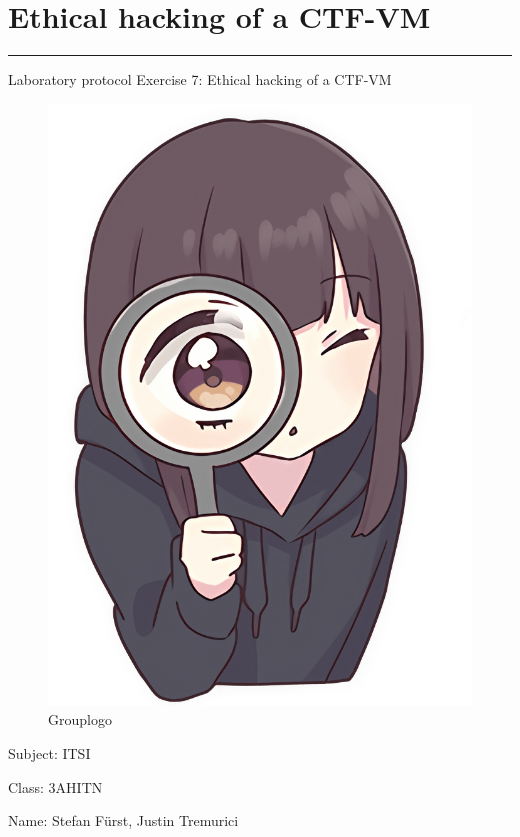\documentclass[a4paper]{article}
\begin{document}

\pagestyle{oida}
\section*{Ethical hacking of a CTF-VM}
\par\noindent\rule{\textwidth}{0.4pt}

Laboratory protocol
Exercise 7: Ethical hacking of a CTF-VM

\begin{figure}[h]
	\includegraphics[scale=0.5]{images/menheraMagnifier.png}
	\centering
	\caption{Grouplogo}
\end{figure}

\vspace*{\fill}
Subject:	ITSI

Class:	3AHITN

Name:	Stefan Fürst, Justin Tremurici
\end{document}
